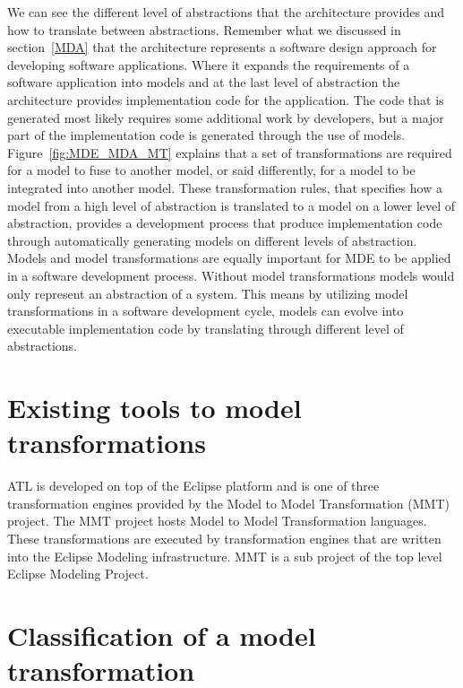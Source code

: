 We can see the different level of abstractions that the architecture provides
and how to translate between abstractions. Remember what we discussed in
section~\ref{MDA} that the architecture represents a software design approach
for developing software applications. Where it expands the requirements of
a software application into models and at the last level of abstraction the
architecture provides implementation code for the application. The code that is
generated most likely requires some additional work by developers, but a major
part of the implementation code is generated through the use of models.
Figure~\ref{fig:MDE_MDA_MT} explains that a set of transformations are required
for a model to fuse to another model, or said differently, for a model to be
integrated into another model. These transformation rules, that specifies how a model from
a high level of abstraction is translated to a model on a lower level of
abstraction, provides a development process that produce implementation code
through automatically generating models on different levels of abstraction.
Models and model transformations are equally important for MDE to be applied in
a software development process. Without model transformations models would only
represent an abstraction of a system. This means by utilizing model
transformations in a software development cycle, models can evolve into
executable implementation code by translating through different level of
abstractions. 

\section{Existing tools to model transformations}
\label{tooling}


ATL is developed on top of the Eclipse platform and is one of three
transformation engines provided by the Model to Model Transformation (MMT)
project\cite{MMT}. The MMT project hosts Model to Model Transformation
languages. These transformations are executed by transformation engines that are
written into the Eclipse Modeling infrastructure. MMT is a sub project of the
top level Eclipse Modeling Project\cite{EMP}. 


\section{Classification of a model transformation}

